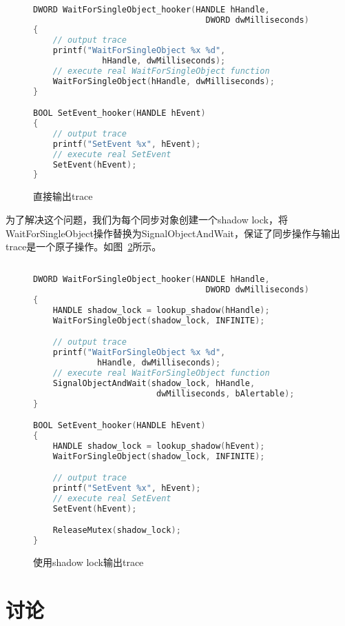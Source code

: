 \begin{figure}
\centering
\begin{lstlisting}[language=C++]

DWORD WaitForSingleObject_hooker(HANDLE hHandle,
                                   DWORD dwMilliseconds)
{
    // output trace
    printf("WaitForSingleObject %x %d",
              hHandle, dwMilliseconds);
    // execute real WaitForSingleObject function
    WaitForSingleObject(hHandle, dwMilliseconds);
}

BOOL SetEvent_hooker(HANDLE hEvent)
{
    // output trace
    printf("SetEvent %x", hEvent);
    // execute real SetEvent
    SetEvent(hEvent);
}
\end{lstlisting}
\caption{直接输出trace}
\label{fig:trace_direct}
\end{figure}

为了解决这个问题，我们为每个同步对象创建一个shadow lock，将
WaitForSingleObject操作替换为SignalObjectAndWait，保证了同步操作与输出
trace是一个原子操作。如图~\ref{fig:trace_shadowlock}所示。

\begin{figure}
\centering
\begin{lstlisting}[language=C++]

DWORD WaitForSingleObject_hooker(HANDLE hHandle, 
                                   DWORD dwMilliseconds)
{
    HANDLE shadow_lock = lookup_shadow(hHandle);
    WaitForSingleObject(shadow_lock, INFINITE);

    // output trace
    printf("WaitForSingleObject %x %d", 
             hHandle, dwMilliseconds);
    // execute real WaitForSingleObject function
    SignalObjectAndWait(shadow_lock, hHandle, 
                         dwMilliseconds, bAlertable);
}

BOOL SetEvent_hooker(HANDLE hEvent)
{
    HANDLE shadow_lock = lookup_shadow(hEvent);
    WaitForSingleObject(shadow_lock, INFINITE);

    // output trace
    printf("SetEvent %x", hEvent);
    // execute real SetEvent
    SetEvent(hEvent);

    ReleaseMutex(shadow_lock);
}

\end{lstlisting}
\caption{使用shadow lock输出trace}
\label{fig:trace_shadowlock}
\end{figure}

\section{讨论}

